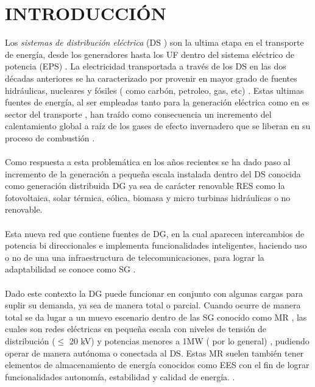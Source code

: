 \documentclass[12pt, letterpaper]{report}
\begin{document}
\chapter*{INTRODUCCIÓN}
Los \textit{sistemas de distribución eléctrica} (\ac{DS} ) son la ultima etapa en el transporte de energía,  desde los generadores hasta los \ac{UF} dentro del sistema eléctrico de potencia (\ac{EPS}) \cite{basso2004ieee}. La electricidad transportada a través de los \ac{DS} en las dos décadas anteriores se ha caracterizado por provenir en mayor grado de fuentes hidráulicas, nucleares y  fósiles ( como carbón, petroleo, gas, etc) \cite{Bacha2015}. Estas ultimas fuentes de energía, al ser empleadas tanto para la generación eléctrica como en es sector del transporte \cite{Bahmanifirouzi2012}, han traído como consecuencia un incremento del calentamiento global a raíz  de los gases de efecto invernadero que se liberan en  su proceso de combustión  \cite{Hauck2017}.\\\\
Como respuesta a esta problemática en los años recientes se ha dado  paso al incremento de la generación a pequeña  escala instalada dentro del \ac{DS} conocida como generación distribuida  \ac{DG} ya sea de carácter renovable   \ac{RES} como la fotovoltaica, solar térmica, eólica, biomasa y micro turbinas hidráulicas  \cite{Calderaro2014} o no renovable. \\\\
Esta nueva red que contiene fuentes de \ac{DG}, en la cual aparecen intercambios de potencia bi direccionales  e implementa funcionalidades inteligentes,  haciendo uso  o no de una una infraestructura de telecomunicaciones, para lograr la adaptabilidad se conoce como \ac{SG} \cite{Bhatt2014}.\\\\ 
Dado este contexto la \ac{DG} puede funcionar  en conjunto con  algunas cargas para suplir su demanda, ya sea de manera total o  parcial. Cuando ocurre de manera total se da lugar a  un muevo escenario dentro de las \ac{SG}  conocido como \ac{MR} \cite{Pegueroles-Queralt2012}, las cuales son redes eléctricas en pequeña escala  con niveles de tensión de distribución ($\leq$ 20 kV)  y potencias menores a 1MW ( por lo general) \cite{Bacha2015}, pudiendo operar de manera autónoma o  conectada al \ac{DS}. Estas \ac{MR} suelen también  tener elementos de almacenamiento de energía conocidos como \ac{EES} con el fin de lograr funcionalidades autonomía, estabilidad  y calidad de energía.  \cite{Babacan2017} \cite{Pegueroles-Queralt2012}.\\\\ 
\end{document}
